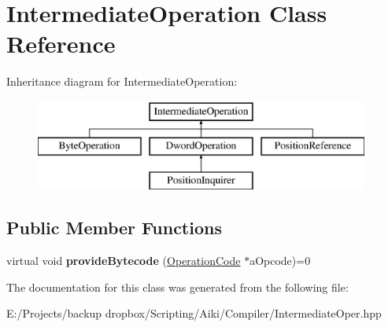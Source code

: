 \hypertarget{a00014}{\section{Intermediate\+Operation Class Reference}
\label{a00014}
}
Inheritance diagram for Intermediate\+Operation\+:\begin{figure}[H]
\begin{center}
\leavevmode
\includegraphics[height=3.000000cm]{d2/de7/a00014}
\end{center}
\end{figure}
\subsection*{Public Member Functions}
\begin{DoxyCompactItemize}
\item 
\hypertarget{a00014_aefbe33217f1ab8d3b4338beb11ed9911}{virtual void {\bfseries provide\+Bytecode} (\hyperlink{a00015}{Operation\+Code} $\ast$a\+Opcode)=0}\label{a00014_aefbe33217f1ab8d3b4338beb11ed9911}

\end{DoxyCompactItemize}


The documentation for this class was generated from the following file\+:\begin{DoxyCompactItemize}
\item 
E\+:/\+Projects/backup dropbox/\+Scripting/\+Aiki/\+Compiler/Intermediate\+Oper.\+hpp\end{DoxyCompactItemize}
